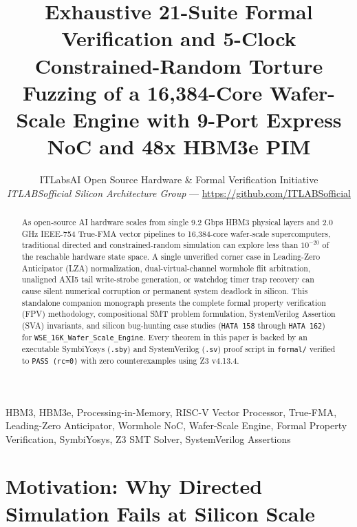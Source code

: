 \documentclass[journal,10pt,twocolumn]{IEEEtran}
\title{Exhaustive 21-Suite Formal Verification and 5-Clock Constrained-Random Torture Fuzzing of a 16,384-Core Wafer-Scale Engine with 9-Port Express NoC and 48x HBM3e PIM}
\author{ITLabsAI Open Source Hardware \& Formal Verification Initiative\\
\textit{ITLABSofficial Silicon Architecture Group} --- \url{https://github.com/ITLABSofficial}}
\begin{document}
\maketitle
\begin{abstract}
As open-source AI hardware scales from single 9.2 Gbps HBM3 physical layers and 2.0 GHz IEEE-754 True-FMA vector pipelines to 16,384-core wafer-scale supercomputers, traditional directed and constrained-random simulation can explore less than $10^{-20}$ of the reachable hardware state space. A single unverified corner case in Leading-Zero Anticipator (LZA) normalization, dual-virtual-channel wormhole flit arbitration, unaligned AXI5 tail write-strobe generation, or watchdog timer trap recovery can cause silent numerical corruption or permanent system deadlock in silicon. This standalone companion monograph presents the complete formal property verification (FPV) methodology, compositional SMT problem formulation, SystemVerilog Assertion (SVA) invariants, and silicon bug-hunting case studies (\texttt{HATA 158} through \texttt{HATA 162}) for \texttt{WSE\_16K\_Wafer\_Scale\_Engine}. Every theorem in this paper is backed by an executable SymbiYosys (\texttt{.sby}) and SystemVerilog (\texttt{.sv}) proof script in \texttt{formal/} verified to \texttt{PASS (rc=0)} with zero counterexamples using Z3 v4.13.4.
\end{abstract}
\begin{IEEEkeywords}
HBM3, HBM3e, Processing-in-Memory, RISC-V Vector Processor, True-FMA, Leading-Zero Anticipator, Wormhole NoC, Wafer-Scale Engine, Formal Property Verification, SymbiYosys, Z3 SMT Solver, SystemVerilog Assertions
\end{IEEEkeywords}


\section{Motivation: Why Directed Simulation Fails at Silicon Scale}
\end{document}
